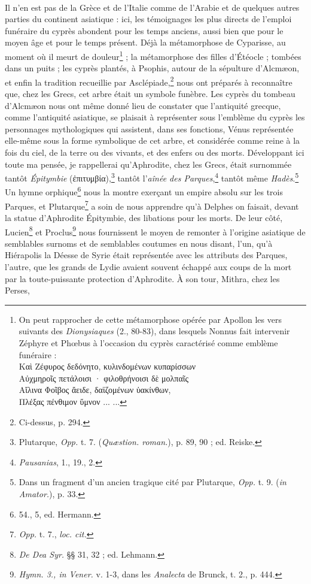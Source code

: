 \documentclass{article}
\begin{document}
\paragraph{}
Il n'en est pas de la Grèce et de l'Italie comme de l'Arabie et de quelques autres parties du continent asiatique : ici, les témoignages les plus directs de l'emploi funéraire du cyprès abondent pour les temps anciens, aussi bien que pour le moyen âge et pour le temps présent. Déjà la métamorphose de Cyparisse, au moment où il meurt de douleur\footnote{On peut rapprocher de cette métamorphose opérée par Apollon les vers suivants des \emph{Dionysiaques} (2., 80-83), dans lesquels Nonnus fait intervenir Zéphyre et Phœbus à l'occasion du cyprès caractérisé comme emblème funéraire :\\\hspace*{10mm}\textgreek{Καὶ Ζέφυρος δεδόνητο, κυλινδομένων κυπαρίσσων\\\hspace*{10mm}Αὐχμηροῖς πετάλοισι · φιλοθρήνοισι δὲ μολπαῖς\\\hspace*{10mm}Αἴλινα Φοῖβος ἄειδε, δαϊζομένων ὑακίνθων,\\\hspace*{10mm}Πλέξας πένθιμον ὕμνον ... ...}} ; la métamorphose des filles d'Étéocle ; tombées dans un puits ; les cyprès plantés, à Psophis, autour de la sépulture d'Alcmæon, et enfin la tradition recueillie par Asclépiade,\footnote{Ci-dessus, p. 294.} nous ont préparés à reconnaître que, chez les Grecs, cet arbre était un symbole funèbre. Les cyprès du tombeau d'Alcmæon nous ont même donné lieu de constater que l'antiquité grecque, comme l'antiquité asiatique, se plaisait à représenter sous l'emblème du cyprès les personnages mythologiques qui assistent, dans ses fonctions, Vénus représentée elle-même sous la forme symbolique de cet arbre, et considérée comme reine à la fois du ciel, de la terre ou des vivants, et des enfers ou des morts. Développant ici toute ma pensée, je rappellerai qu'Aphrodite, chez les Grecs, était surnommée tantôt \emph{Épitymbie} (\textgreek{ἐπιτυμβία}),\footnote{Plutarque, \emph{Opp.} t. 7. (\emph{Quæstion. roman.}), p. 89, 90 ; ed. Reiske.} tantôt l'\emph{aînée des Parques},\footnote{\emph{Pausanias}, 1., 19., 2.} tantôt même \emph{Hadès}.\footnote{Dans un fragment d'un ancien tragique cité par Plutarque, \emph{Opp.} t. 9. (\emph{in Amator.}), p. 33.} Un hymne orphique\footnote{54., 5, ed. Hermann.} nous la montre exerçant un empire absolu sur les trois Parques, et Plutarque\footnote{\emph{Opp.} t. 7., \emph{loc. cit.}} a soin de nous apprendre qu'à Delphes on faisait, devant la statue d'Aphrodite Épitymbie, des libations pour les morts. De leur côté, Lucien\footnote{\emph{De Dea Syr.} §§ 31, 32 ; ed. Lehmann.} et Proclus\footnote{\emph{Hymn. 3., in Vener.} v. 1-3, dans les \emph{Analecta} de Brunck, t. 2., p. 444.} nous fournissent le moyen de remonter à l'origine asiatique de semblables surnoms et de semblables coutumes en nous disant, l'un, qu'à Hiérapolis la Déesse de Syrie était représentée avec les attributs des Parques, l'autre, que les grands de Lydie avaient souvent échappé aux coups de la mort par la toute-puissante protection d'Aphrodite. À son tour, Mithra, chez les Perses, 
\end{document}
